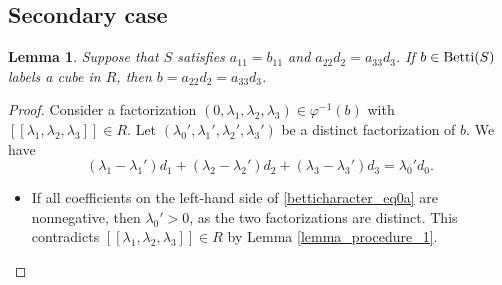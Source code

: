 \documentclass[12pt]{article}
\newtheorem{lemma}[thm]{Lemma}
\theoremstyle{remark}
\begin{document}
\subsection{Secondary case}


\begin{lemma}\label{lemmabettifind_secondary}
   Suppose that $S$ satisfies $a_{11} = b_{11}$ and $a_{22}d_2 = a_{33}d_3$. If $b \in \textup{Betti}(S)$ labels a cube in $R$, then $b = a_{22}d_2 = a_{33}d_3$.
\end{lemma}
    
\begin{proof}
    Consider a factorization $(0,\lambda_1,\lambda_2, \lambda_3) \in \varphi^{-1}(b)$ with $[[\lambda_1,\lambda_2,\lambda_3]] \in R$. Let $(\lambda_0',\lambda_1',\lambda_2', \lambda_3')$ be a distinct factorization of $b$. We have
    \begin{equation}\label{betticharacter_eq0a}
        (\lambda_1-\lambda_1')d_1 +  (\lambda_2-\lambda_2')d_2 +  (\lambda_3-\lambda_3')d_3 = \lambda_0'd_0.
    \end{equation}
    \begin{itemize}
    \item 
    If all coefficients on the left-hand side of \eqref{betticharacter_eq0a} are nonnegative, then $\lambda_0'>0$, as the two factorizations are distinct. This contradicts $[[\lambda_1,\lambda_2,\lambda_3]] \in R$ by Lemma \ref{lemma_procedure_1}.


\end{itemize}
\end{proof}
\end{document}
